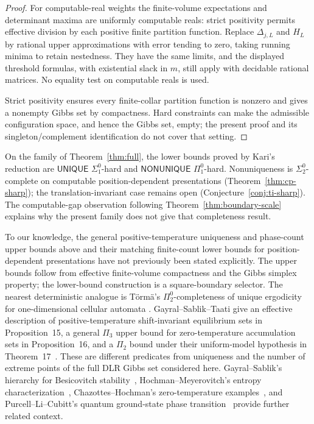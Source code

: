 \begin{proof}
For computable-real weights the finite-volume expectations and determinant maxima are uniformly computable reals: strict positivity permits effective division by each positive finite partition function. Replace $\Delta_{j,L}$ and $H_L$ by rational upper approximations with error tending to zero, taking running minima to retain nestedness. They have the same limits, and the displayed threshold formulas, with existential slack in $m$, still apply with decidable rational matrices. No equality test on computable reals is used.

Strict positivity ensures every finite-collar partition function is nonzero and gives a nonempty Gibbs set by compactness. Hard constraints can make the admissible configuration space, and hence the Gibbs set, empty; the present proof and its singleton/complement identification do not cover that setting.
\end{proof}



On the family of Theorem~\ref{thm:full}, the lower bounds proved by Kari's reduction are $\mathsf{UNIQUE}$ $\Sigma^0_1$-hard and $\mathsf{NONUNIQUE}$ $\Pi^0_1$-hard. Nonuniqueness is $\Sigma^0_2$-complete on computable position-dependent presentations (Theorem~\ref{thm:cp-sharp}); the translation-invariant case remains open (Conjecture~\ref{conj:ti-sharp}). The computable-gap observation following Theorem~\ref{thm:boundary-scale} explains why the present family does not give that completeness result.

To our knowledge, the general positive-temperature uniqueness and phase-count upper bounds above and their matching finite-count lower bounds for position-dependent presentations have not previously been stated explicitly. The upper bounds follow from effective finite-volume compactness and the Gibbs simplex property; the lower-bound construction is a square-boundary selector. The nearest deterministic analogue is T\"orm\"a's $\Pi^0_2$-completeness of unique ergodicity for one-dimensional cellular automata \cite[Proposition 48, arXiv numbering]{Torma2015}. Gayral--Sablik--Taati give an effective description of positive-temperature shift-invariant equilibrium sets in Proposition~15, a general $\Pi_3$ upper bound for zero-temperature accumulation sets in Proposition~16, and a $\Pi_2$ bound under their uniform-model hypothesis in Theorem~17~\cite{GST}. These are different predicates from uniqueness and the number of extreme points of the full DLR Gibbs set considered here. Gayral--Sablik's hierarchy for Besicovitch stability~\cite[Theorem 5.11 and Section 6]{GS}, Hochman--Meyerovitch's entropy characterization~\cite[Theorem 1.1]{HM}, Chazottes--Hochman's zero-temperature examples~\cite[Theorem 1.2]{CH}, and Purcell--Li--Cubitt's quantum ground-state phase transition~\cite[Theorem 1]{PLC} provide further related context.
